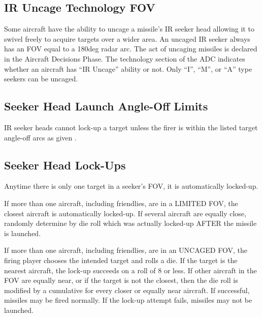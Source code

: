 \subsection{IR Uncage Technology FOV} \label{rule:ir-uncage} Some aircraft have the ability to uncage a missile's IR seeker head allowing it to swivel freely to acquire targets over a wider area. An uncaged IR seeker always has an FOV equal to a 180{deg} radar arc. The act of uncaging missiles is declared in the Aircraft Decisions Phase. The technology section of the ADC indicates whether an aircraft has “IR Uncage” ability or not. Only “I”, “M”, or “A” type seekers can be uncaged.


\subsection{Seeker Head Launch Angle-Off Limits} IR seeker heads cannot lock-up a target unless the firer is within the listed target angle-off arcs as given .


\subsection{Seeker Head Lock-Ups} Anytime there is only one target in a seeker's FOV, it is automatically locked-up.

If more than one aircraft, including friendlies, are in a LIMITED FOV, the closest aircraft is automatically locked-up. If several aircraft are equally close, randomly determine by die roll which was actually locked-up AFTER the missile is launched.

If more than one aircraft, including friendlies, are in an UNCAGED FOV, the firing player chooses the intended target and rolls a die. If the target is the nearest aircraft, the lock-up succeeds on a roll of 8 or less. If other aircraft in the FOV are equally near, or if the target is not the closest, then the die roll is modified by a cumulative  for every closer or equally near aircraft. If successful, missiles may be fired normally. If the lock-up attempt fails, missiles may not be launched. 

